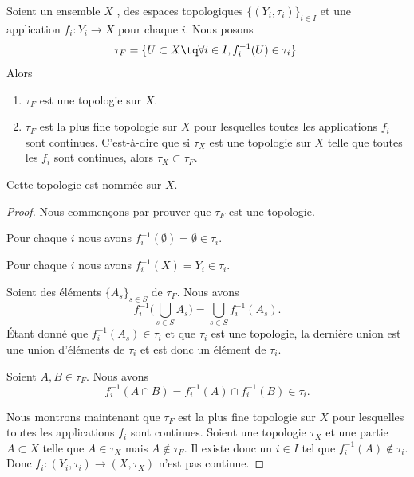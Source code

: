\begin{propositionDef}	\label{PROPooZRQTooOtqjLn}
	Soient un ensemble \( X\) , des espaces topologiques \( \{ (Y_i,\tau_i) \}_{i\in I}\) et une application \(f_i \colon Y_i\to X  \) pour chaque \( i\). Nous posons
	\begin{equation}
		\tau_F=\{ U\subset X\tq\forall i\in I, f_i^{-1}(U)\in\tau_i \}.
	\end{equation}
	Alors
	\begin{enumerate}
		\item
		      \( \tau_F\) est une topologie sur \( X\).
		\item
		      \( \tau_F\) est la plus fine topologie sur \( X\) pour lesquelles toutes les applications \( f_i\) sont continues. C'est-à-dire que si \( \tau_X\) est une topologie sur \( X\) telle que toutes les \( f_i\) sont continues, alors \( \tau_X\subset \tau_F\).
	\end{enumerate}
	Cette topologie est nommée  sur \( X\).
\end{propositionDef}

\begin{proof}
	Nous commençons par prouver que \( \tau_F\) est une topologie.
	\begin{subproof}
		Pour chaque \( i\) nous avons \( f_i^{-1}(\emptyset)=\emptyset\in\tau_i\).

		\spitem[\( X\in\in\tau_F\)]
		Pour chaque \( i\) nous avons \( f_i^{-1}(X)=Y_i\in\tau_i\).

		\spitem[Union]
		Soient des éléments \( \{ A_s \}_{s\in S}\) de \( \tau_F\). Nous avons
		\begin{equation}
			f_i^{-1}\big( \bigcup_{s\in S}A_s \big)=\bigcup_{s\in S}f_i^{-1}(A_s).
		\end{equation}
		Étant donné que \( f_i^{-1}(A_s)\in \tau_i\) et que \( \tau_i\) est une topologie, la dernière union est une union d'éléments de \( \tau_i\) et est donc un élément de \( \tau_i\).

		\spitem[Intersection]
		Soient \( A,B\in \tau_F\). Nous avons
		\begin{equation}
			f_i^{-1}(A\cap B)=f_i^{-1}(A)\cap f_i^{-1}(B)\in \tau_i.
		\end{equation}
	\end{subproof}

	Nous montrons maintenant que \( \tau_F\) est la plus fine topologie sur \( X\) pour lesquelles toutes les applications \( f_i\) sont continues. Soient une topologie \( \tau_X\) et une partie \( A\subset X\) telle que \( A\in\tau_X\) mais \( A\not\in \tau_F\). Il existe donc un \( i\in I\) tel que \( f_i^{-1}(A)\not\in\tau_i\). Donc \(f_i \colon (Y_i,\tau_i)\to (X,\tau_X)  \) n'est pas continue.
\end{proof}

